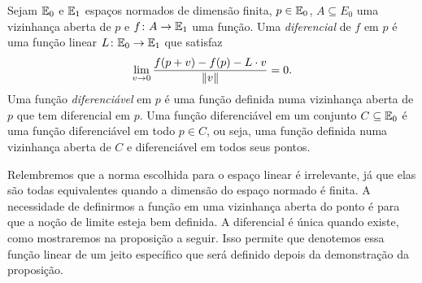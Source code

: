 \begin{definition}
Sejam $\mathbb{E}_0$ e $\mathbb{E}_1$ espaços normados de dimensão finita, $p \in \mathbb{E}_0$, $A \subseteq E_0$ uma vizinhança aberta de $p$ e $f\colon A \to \mathbb{E}_1$ uma função. Uma \emph{diferencial} de $f$ em $p$ é uma função linear $L\colon \mathbb{E}_0 \to \mathbb{E}_1$ que satisfaz
	\begin{equation*}
	\lim_{v \to 0} \frac{f(p+v) - f(p)-L \cdot v}{\left\Vert{v}\right\Vert} = 0.
	\end{equation*}
Uma função \emph{diferenciável} em $p$ é uma função definida numa vizinhança aberta de $p$ que tem diferencial em $p$. Uma função diferenciável em um conjunto $C \subseteq \mathbb{E}_0$ é uma função diferenciável em todo $p \in C$, ou seja, uma função definida numa vizinhança aberta de $C$ e diferenciável em todos seus pontos.
\end{definition}


Relembremos que a norma escolhida para o espaço linear é irrelevante, já que elas são todas equivalentes quando a dimensão do espaço normado é finita. A necessidade de definirmos a função em uma vizinhança aberta do ponto é para que a noção de limite esteja bem definida. %
A diferencial é única quando existe, como mostraremos na proposição a seguir. Isso permite que denotemos essa função linear de um jeito específico que será definido depois da demonstração da proposição.

